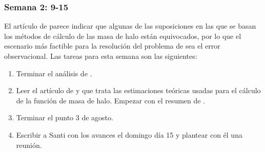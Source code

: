 \subsubsection*{Semana 2: 9-15}
El artículo de \cite{wang2019dominant} parece indicar que algunas de las suposiciones en las que se basan los métodos de cálculo de las masa de halo están equivocados, por lo que el escenario más factible para la resolución del problema de \cite{steinhardt2016impossibly} sea el error observacional. Las tareas para esta semana son las siguientes:
\begin{enumerate}
\item Terminar el análisis de \cite{steinhardt2016impossibly}.
\item Leer el artículo de \cite{sheth2001ellipsoidal} y \cite{murray2013hmfcalc} que trata las estimaciones teóricas usadas para el cálculo de la función de masa de halo. Empezar con el resumen de \cite{sheth2001ellipsoidal}.
\item Terminar el punto 3 de agosto.
\item Escribir a Santi con los avances el domingo día 15 y plantear con él una reunión.
\end{enumerate}